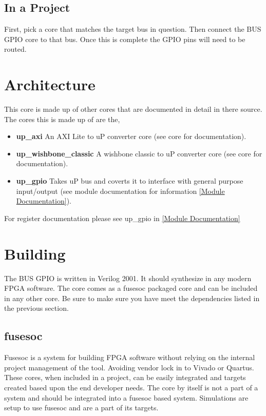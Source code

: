 





\subsection{In a Project}
\par
First, pick a core that matches the target bus in question. Then connect the BUS GPIO core to that bus. Once this is complete the GPIO pins will need
to be routed.

\section{Architecture}
\par
This core is made up of other cores that are documented in detail in there source. The cores this is made up of are the,
\begin{itemize}
  \item \textbf{up\_axi} An AXI Lite to uP converter core (see core for documentation).
  \item \textbf{up\_wishbone\_classic} A wishbone classic to uP converter core (see core for documentation).
  \item \textbf{up\_gpio} Takes uP bus and coverts it to interface with general purpose input/output (see module documentation for information \ref{Module Documentation}).
\end{itemize}

For register documentation please see up\_gpio in \ref{Module Documentation}

\section{Building}

\par
The BUS GPIO is written in Verilog 2001. It should synthesize in any modern FPGA software. The core comes as a fusesoc packaged core and can be
included in any other core. Be sure to make sure you have meet the dependencies listed in the previous section.

\subsection{fusesoc}
\par
Fusesoc is a system for building FPGA software without relying on the internal project management of the tool. Avoiding vendor lock in to Vivado or Quartus.
These cores, when included in a project, can be easily integrated and targets created based upon the end developer needs. The core by itself is not a part of
a system and should be integrated into a fusesoc based system. Simulations are setup to use fusesoc and are a part of its targets.

